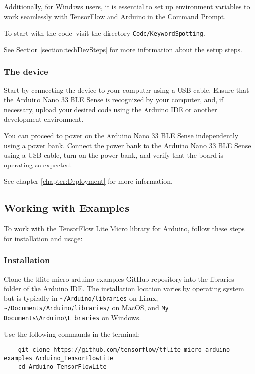 Additionally, for Windows users, it is essential to set up environment variables to work seamlessly with TensorFlow and Arduino in the Command Prompt.

To start with the code, visit the directory \texttt{Code/KeywordSpotting}.

See Section \ref{section:techDevSteps} for more information about the setup steps.


\subsubsection{The device}

Start by connecting the device to your computer using a USB cable. Ensure that the Arduino Nano 33 BLE Sense is recognized by your computer, and, if necessary, upload your desired code using the Arduino IDE or another development environment. 

You can proceed to power on the Arduino Nano 33 BLE Sense independently using a power bank. Connect the power bank to the Arduino Nano 33 BLE Sense using a USB cable, turn on the power bank, and verify that the board is operating as expected.

See chapter \ref{chapter:Deployment} for more information.

\subsection{Working with Examples}

To work with the TensorFlow Lite Micro library for Arduino, follow these steps for installation and usage:

\subsubsection{Installation}

Clone the tflite-micro-arduino-examples GitHub repository into the libraries folder of the Arduino IDE. The installation location varies by operating system but is typically in \texttt{\textasciitilde/Arduino/libraries} on Linux, \texttt{\textasciitilde/Documents/Arduino/libraries/} on MacOS, and \texttt{My Documents\textbackslash Arduino\textbackslash Libraries} on Windows.

Use the following commands in the terminal:

\begin{verbatim}
	git clone https://github.com/tensorflow/tflite-micro-arduino-examples Arduino_TensorFlowLite
	cd Arduino_TensorFlowLite
\end{verbatim}
	
